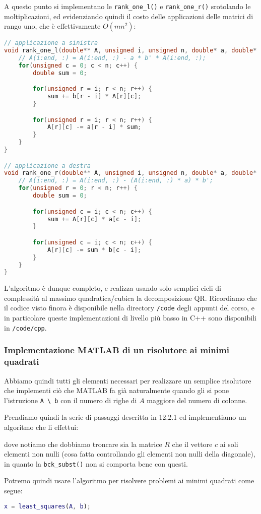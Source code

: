 \documentclass[a4paper,11pt]{article}
\begin{document}
A questo punto si implementano le \lstinline|rank_one_l()| e \lstinline|rank_one_r()| srotolando le moltiplicazioni, ed evidenziando quindi il costo delle applicazioni delle matrici di rango uno, che è effettivamente $O(mn^2)$:
\begin{lstlisting}[language=C++, style=codestyle]	
// applicazione a sinistra
void rank_one_l(double** A, unsigned i, unsigned n, double* a, double* b) {
	// A(i:end, :) = A(i:end, :) - a * b' * A(i:end, :);
	for(unsigned c = 0; c < n; c++) {
		double sum = 0;

		for(unsigned r = i; r < n; r++) {
			sum += b[r - i] * A[r][c]; 
		}

		for(unsigned r = i; r < n; r++) {
			A[r][c] -= a[r - i] * sum;
		}
	}
}

// applicazione a destra
void rank_one_r(double** A, unsigned i, unsigned n, double* a, double* b) {
	// A(i:end, :) = A(i:end, :) - (A(i:end, :) * a) * b';
	for(unsigned r = 0; r < n; r++) {
		double sum = 0;

		for(unsigned c = i; c < n; c++) {
			sum += A[r][c] * a[c - i]; 
		}

		for(unsigned c = i; c < n; c++) {
			A[r][c] -= sum * b[c - i];
		}
	}
}
\end{lstlisting}

L'algoritmo è dunque completo, e realizza usando solo semplici cicli di complessità al massimo quadratica/cubica la decomposizione QR.
Ricordiamo che il codice visto finora è disponibile nella directory \lstinline|/code| degli appunti del corso, e in particolare queste implementazioni di livello più basso in C++ sono disponibili in \lstinline|/code/cpp|.

\subsubsection{Implementazione MATLAB di un risolutore ai minimi quadrati}
Abbiamo quindi tutti gli elementi necessari per realizzare un semplice risolutore che implementi ciò che MATLAB fa già naturalmente quando gli si pone l'istruzione \lstinline|A \ b| con il numero di righe di $A$ maggiore del numero di colonne.

Prendiamo quindi la serie di passaggi descritta in 12.2.1 ed implementiamo un algoritmo che li effettui:

dove notiamo che dobbiamo troncare sia la matrice $R$ che il vettore $c$ ai soli elementi non nulli (cosa fatta controllando gli elementi non nulli della diagonale), in quanto la \lstinline|bck_subst()| non si comporta bene con questi.

Potremo quindi usare l'algoritmo per risolvere problemi ai minimi quadrati come segue:
\begin{lstlisting}[language=matlab, style=codestyle]	
% dati A, b noti
x = least_squares(A, b);
\end{lstlisting}
\end{document}
